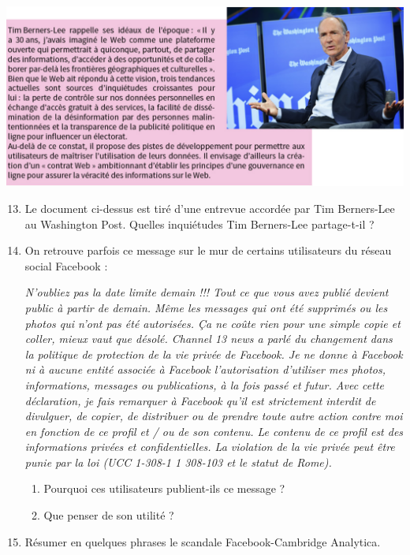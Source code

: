 \documentclass[a4paper]{article}
\begin{document}
\begin{center}
  \includegraphics[width=16cm]{tim_berners-lee_entrevue_washington_post.png}
\end{center}

\begin{enumerate}
  \setcounter{enumi}{12}
  \item Le document ci-dessus est tiré d'une entrevue accordée par Tim Berners-Lee au Washington Post. Quelles inquiétudes Tim Berners-Lee partage-t-il ?
  \item On retrouve parfois ce message sur le mur de certains utilisateurs du réseau social Facebook :

    \begin{center}
      \textit{N'oubliez pas la date limite demain !!! Tout ce que vous avez publié devient public à partir de demain. Même les messages qui ont été supprimés ou les photos qui n'ont pas été autorisées. Ça ne coûte rien pour une simple copie et coller, mieux vaut que désolé. Channel 13 news a parlé du changement dans la politique de protection de la vie privée de Facebook. Je ne donne à Facebook ni à aucune entité associée à Facebook l'autorisation d'utiliser mes photos, informations, messages ou publications, à la fois passé et futur. Avec cette déclaration, je fais remarquer à Facebook qu'il est strictement interdit de divulguer, de copier, de distribuer ou de prendre toute autre action contre moi en fonction de ce profil et / ou de son contenu. Le contenu de ce profil est des informations privées et confidentielles. La violation de la vie privée peut être punie par la loi (UCC 1-308-1 1 308-103 et le statut de Rome).}
    \end{center}

    \begin{enumerate}[resume]
      \item Pourquoi ces utilisateurs publient-ils ce message ?
      \item Que penser de son utilité ?
    \end{enumerate}
  \item Résumer en quelques phrases le scandale Facebook-Cambridge Analytica.
\end{enumerate}
\end{document}
